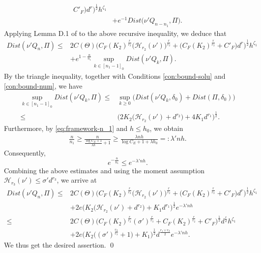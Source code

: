 \documentclass[12pt]{article}
\numberwithin{equation}{section}
\renewenvironment{proof}%
  {\begin{trivlist}%
   \item[]\ignorespaces}%
  {\qed\end{trivlist}}
\begin{document}
\begin{proof}
\begin{align}
    C'_{F}\big)d^{r}
    \Big)^{\frac{1}{2}}
    h^{\zeta_1}
    \nonumber \\ 
    &+
    e^{-1}
    \textit{Dist}
    \big(
        \nu' Q_{n-n_1},
        \Pi
    \big).
\end{align}
Applying Lemma D.1 of \cite{yang2025non} to the above recursive inequality, we deduce that
\begin{align}
    \textit{Dist}(\nu' Q_n , \Pi) 
    \leq&
    2 C(\Theta)
    \Big(
    C_F
    (K_2)^{\frac{r}{r_2}}
    \big(\mathcal{H}_{r_2}(\nu')\big)^{\frac{r}{r_2}}
    +
    \big(C_F 
    (K_2)^{\frac{r}{r_2}}
    +
    C'_{F}
    \big)d^{r}
    \Big)^{\frac{1}{2}}
    h^{\zeta_1}
    \nonumber\\
    &
    +
    e^{1-\frac{n}{n_1}}\sup_{k\in[n_1-1]_0}\textit{Dist}(\nu' Q_k,\Pi).
\end{align}
By the triangle inequality, together with Conditions \ref{con:bound-solu} and \ref{con:bound-num}, we have
\begin{align}
    \sup_{k\in [n_1-1]_0} \textit{Dist}(\nu' Q_{k},\Pi) 
    \leq&
    \sup_{k\geq 0} 
    \big(
    \textit{Dist}
    (\nu' Q_{k},\delta_0)
    +
    \textit{Dist}
    (\Pi,  \delta_0)
    \big)
    \nonumber \\
    \leq
    &
    \Big(
    2
    K_2
    \big(
    \mathcal{H}_{r_2}(\nu')
    +
    d^{r_2}
    \big)
    +
    4K_1
    d^{r_1}
    \Big)^{\frac{1}{2}}.
\end{align}
Furthermore, by \eqref{eq:framework-n_1} and $h\leq h_0$, we obtain
\begin{align}
    \tfrac{n}{n_1}\geq \tfrac{n}{\frac{\log C_E+1}{\lambda h}+1} \geq \tfrac{ \lambda n  h}{\log C_E+1+\lambda h_0}
    = : \lambda'nh.
\end{align}
Consequently,
\[
e^{-\frac{n}{n_1}}\leq e^{-\lambda'nh}.
\]
Combining the above estimates and 
using the moment assumption
$\mathcal{H}_{r_3}(\nu') \leq \sigma' d^{r_3}$, we arrive at
\begin{align}
    \textit{Dist}(\nu' Q_n , \Pi)     
    \leq
    &  
    2
    C(\Theta)
    \Big(
    C_F
    (K_2) ^{\frac{r}{r_2}}
    \big(\mathcal{H}_{r_2}(\nu')\big)^{\frac{r}{r_2}}
    +
    \big(C_F (K_2)^{\frac{r}{r_2}}
    +
    C'_{F}\big)d^{r}
    \Big)^{\frac{1}{2}}
    h^{\zeta_1}
    \\   &
    +
    2e
    \Big(
    K_2
    \big(
    \mathcal{H}_{r_2}(\nu')
    +
    d^{r_2}
    \big)
    +
    K_1
    d^{r_1}
    \Big)^{\frac{1}{2}}
    e^{-\lambda'nh}\nonumber
    \\
    \leq
    &
    2
    C(\Theta)
    \big(
    C_F(K_2)^{\frac{r}{r_2}} 
    (\sigma')^{\frac{r}{r_3}}
    +
    C_F(K_2)^{\frac{r}{r_2}}+C'_{F}
    \big)^{\frac{1}{2}}
    d^{\frac{r}{2}}
    h^{\zeta_1}
    \nonumber\\
    &
    +
    2e
    \Big(
    K_2\big(
    (\sigma')^{\frac{r_2}{r_3}}
    +1\big)
    +K_1
    \Big)
    ^{\frac{1}{2}}
    d^{\frac{r_1 \vee r_2}{2}}
    e^{-\lambda'nh}.
\end{align}
We thus get the desired assertion.
\end{proof}
\end{document}
